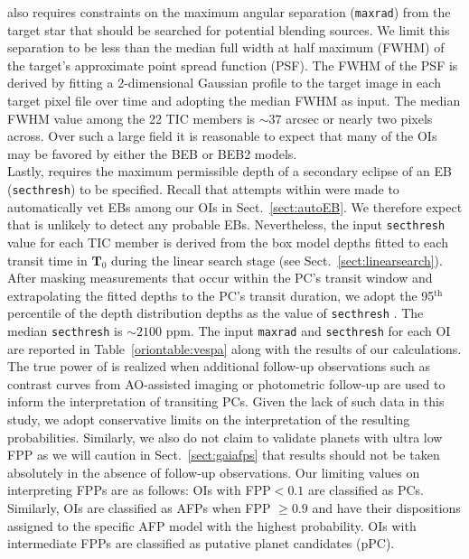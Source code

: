 \vespa{} also requires constraints on the maximum angular separation
(\texttt{maxrad}) from the target star that
should be searched for potential blending sources. We limit this separation to be less than the median
full width at half maximum (FWHM) of the target's approximate point spread function (PSF).
The FWHM of the PSF is derived by fitting a 2-dimensional Gaussian profile to the
target image in each target pixel file over time and adopting the median FWHM as \vespa{} input.
The median FWHM value among the 22 TIC members is $\sim 37$ arcsec or nearly two \tess{} pixels across.
Over such a large field it is reasonable to expect that many of the OIs may be favored by either the
BEB or BEB2 models. \\

Lastly, \vespa{} requires
the maximum permissible depth of a secondary eclipse of an EB (\texttt{secthresh}) to be specified.
Recall that attempts within \pipeline{} were made to automatically vet EBs among our OIs in
Sect.~\ref{sect:autoEB}.
We therefore expect that \vespa{} is unlikely to detect any probable EBs. Nevertheless, the input
\texttt{secthresh} value for each TIC member is derived from
the box model depths fitted to each transit time in $\mathbf{T}_0$ during the linear search stage
(see Sect.~\ref{sect:linearsearch}). After masking measurements that occur within the PC's
transit window and extrapolating the fitted depths to the PC's transit duration,
we adopt the 95$^{\text{th}}$ percentile of the depth distribution depths as the value of \texttt{secthresh}
\citep{crossfield18}. The median \texttt{secthresh} is $\sim 2100$ ppm. The input \texttt{maxrad} and
\texttt{secthresh} for each OI are reported in Table~\ref{oriontable:vespa} along with the results of
our \vespa{} calculations. \\



The true power of \vespa{} is realized when additional follow-up observations such as 
contrast curves from AO-assisted imaging or photometric follow-up
are used to inform the interpretation of transiting PCs.
Given the lack of such data in this study, we adopt conservative limits on the interpretation of the
resulting \vespa{} probabilities. Similarly, we also do not claim to validate planets with ultra low FPP
\citep[$<0.01$; e.g.][]{montet15,crossfield18,livingston18} as we will caution in Sect.~\ref{sect:gaiafps}
that \vespa{} results should not be taken absolutely in the absence of follow-up
observations. Our limiting values on interpreting FPPs are as follows: OIs with FPP$<0.1$
are classified as PCs. Similarly, OIs are classified as AFPs when
FPP $\geq 0.9$ and have their dispositions assigned to the specific AFP model with the highest
probability. OIs with intermediate FPPs are classified as putative planet candidates (pPC). \\

